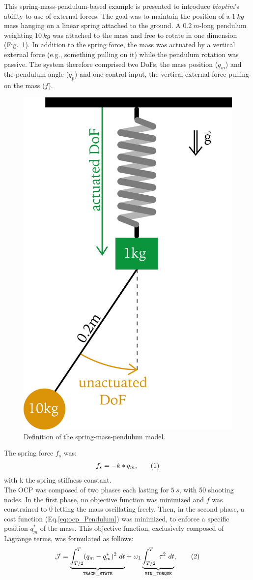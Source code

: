 This spring-mass-pendulum-based example is presented to introduce \textit{bioptim}'s ability to use of external forces.
The goal was to maintain the position of a $\SI{1}{kg}$ mass hanging on a linear spring attached to the ground.
A $\SI{0.2}{m}$-long pendulum weighting $\SI{10}{kg}$ was attached to the mass and free to rotate in one dimension (Fig.~\ref{fig:Mass_Pendulum_Model}).
In addition to the spring force, the mass was actuated by a vertical external force (e.g., something pulling on it) while the pendulum rotation was passive.
The system therefore comprised two DoFs, the mass position ($q_m$) and the pendulum angle ($q_p$) and one control input, the vertical external force pulling on the mass ($f$). 
\begin{figure}[h!]
\centering
\includegraphics[width=0.35\columnwidth]{figures/Mass_Pendulum_Model.png}
\caption{Definition of the spring-mass-pendulum model.}
\label{fig:Mass_Pendulum_Model}
\end{figure}
The spring force $f_s$ was:
\[
\begin{aligned}
f_s = -k*q_m,
\end{aligned}
\addtag
\label{eq:f_ext}
\]
with k the spring stiffness constant.\\
The OCP was composed of two phases each lasting for $\SI{5}{s}$, with 50 shooting nodes.
In the first phase, no objective function was minimized and $f$ was constrained to $0$ letting the mass oscillating freely. 
Then, in the second phase, a cost function (Eq.\ref{eq:ocp_Pendulum}) was minimized, to enforce a specific position $q_m^*$ of the mass.
This objective function, exclusively composed of Lagrange terms, was formulated as follows:
\[
\mathcal{J} = \underbrace{\int_{T/2}^T (q_m - q_m^*)^2~dt}_{\mathtt{TRACK\_STATE}}  +~\omega_1 \underbrace{\int_{T/2}^T ~\tau^2~dt}_{\mathtt{MIN\_ TORQUE}},
\addtag
\label{eq:ocp_Pendulum}
\]

